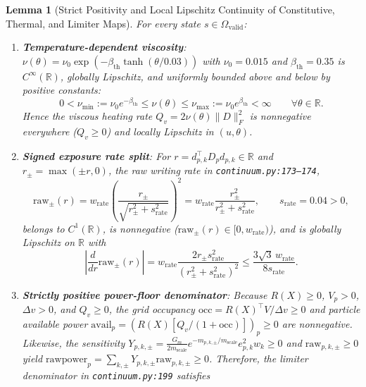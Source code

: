 \documentclass[11pt,a4paper]{article}
\newtheorem{lemma}[theorem]{Lemma}
\theoremstyle{definition}
\begin{document}
\begin{lemma}[Strict Positivity and Local Lipschitz Continuity of Constitutive, Thermal, and Limiter Maps]
\label{lem:constitutive}
For every state $s \in \Omega_{\mathrm{valid}}$:
\begin{enumerate}
  \item \textbf{Temperature-dependent viscosity}: $\nu(\theta) = \nu_0 \exp(-\beta_{\mathrm{th}}\tanh(\theta/0.03))$ with $\nu_0 = 0.015$ and $\beta_{\mathrm{th}} = 0.35$ is $C^\infty(\mathbb{R})$, globally Lipschitz, and uniformly bounded above and below by positive constants:
  \begin{equation}
    0 < \nu_{\min} := \nu_0 e^{-\beta_{\mathrm{th}}} \le \nu(\theta) \le \nu_{\max} := \nu_0 e^{\beta_{\mathrm{th}}} < \infty \qquad \forall \theta \in \mathbb{R}.
  \end{equation}
  Hence the viscous heating rate $Q_v = 2\nu(\theta)\|D\|_F^2$ is nonnegative everywhere ($Q_v \ge 0$) and locally Lipschitz in $(u, \theta)$.
  \item \textbf{Signed exposure rate split}: For $r = d_{p,k}^\top D_p d_{p,k} \in \mathbb{R}$ and $r_\pm = \max(\pm r, 0)$, the raw writing rate in \texttt{continuum.py:173--174},
  \begin{equation}
    \mathrm{raw}_\pm(r) = w_{\mathrm{rate}}\left(\frac{r_\pm}{\sqrt{r_\pm^2 + s_{\mathrm{rate}}^2}}\right)^2 = w_{\mathrm{rate}} \frac{r_\pm^2}{r_\pm^2 + s_{\mathrm{rate}}^2}, \qquad s_{\mathrm{rate}} = 0.04 > 0,
  \end{equation}
  belongs to $C^1(\mathbb{R})$, is nonnegative ($\mathrm{raw}_\pm(r) \in [0, w_{\mathrm{rate}})$), and is globally Lipschitz on $\mathbb{R}$ with
  \begin{equation}
    \left|\frac{d}{dr}\mathrm{raw}_\pm(r)\right| = w_{\mathrm{rate}} \frac{2 r_\pm s_{\mathrm{rate}}^2}{(r_\pm^2 + s_{\mathrm{rate}}^2)^2} \le \frac{3\sqrt{3}\,w_{\mathrm{rate}}}{8 s_{\mathrm{rate}}}.
  \end{equation}
  \item \textbf{Strictly positive power-floor denominator}: Because $R(X) \ge 0$, $V_p > 0$, $\Delta v > 0$, and $Q_v \ge 0$, the grid occupancy $\mathrm{occ} = R(X)^\top V / \Delta v \ge 0$ and particle available power $\mathrm{avail}_p = (R(X)[Q_v/(1+\mathrm{occ})])_p \ge 0$ are nonnegative. Likewise, the sensitivity $Y_{p,k,\pm} = \frac{G_m}{2 m_{\mathrm{scale}}}e^{-m_{p,k,\pm}/m_{\mathrm{scale}}}e_{p,k}^2 w_k \ge 0$ and $\mathrm{raw}_{p,k,\pm} \ge 0$ yield $\mathrm{rawpower}_p = \sum_{k,\pm} Y_{p,k,\pm}\mathrm{raw}_{p,k,\pm} \ge 0$. Therefore, the limiter denominator in \texttt{continuum.py:199} satisfies

\end{enumerate}
\end{lemma}
\end{document}
